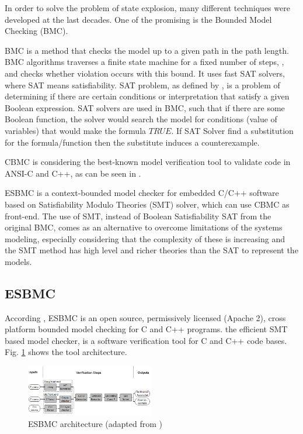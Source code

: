 \documentclass[journal]{IEEEtran}
\begin{document}
In order to solve the problem of state explosion, many different techniques were developed at the last decades. One of the promising is the Bounded Model Checking (BMC). 

BMC is a method that checks the model up to a given path in the path length. BMC algorithms traverses a finite state machine for a fixed number of steps, , and checks whether violation occurs with this bound. It uses fast SAT solvers, where SAT means satisfiability. SAT problem, as defined by \cite{Clarke2008}, is a problem of determining if there are certain conditions or interpretation that satisfy a given Boolean expression. SAT solvers are used in BMC, such that if there are some Boolean function, the solver would search the model for conditions (value of variables) that would make the formula $TRUE$. If SAT Solver find a substitution for the formula/function then the substitute induces a counterexample.  

CBMC is considering the best-known model verification tool to validate code in ANSI-C and C++, as can be seen in \cite{Kroening}. 

ESBMC is a context-bounded model checker for embedded C/C++ software based on Satisfiability Modulo Theories (SMT) solver, which can use CBMC as front-end.  
The use of SMT, instead of Boolean Satisfiability SAT from the original BMC, comes as an alternative to overcome limitations of the systems modeling, especially considering that the complexity of these is increasing and the SMT method has high level and richer theories than the SAT to represent the models. 

\subsection{ESBMC }
According \cite{GadelhaSBMF}, ESBMC is an open source, permissively licensed (Apache 2), cross platform bounded model checking for C and C++ programs. the efficient SMT based model checker, is a software verification tool for C and C++ code bases. Fig. \ref{fig:esbmcarch} shows the tool architecture. 

\begin{figure}[h]
\includegraphics[width=0.5\textwidth]{ESBMCarch2}
\centering
\caption{ESBMC architecture (adapted from \cite{GadelhaSBMF})}
\label{fig:esbmcarch}
\end{figure}
\end{document}
